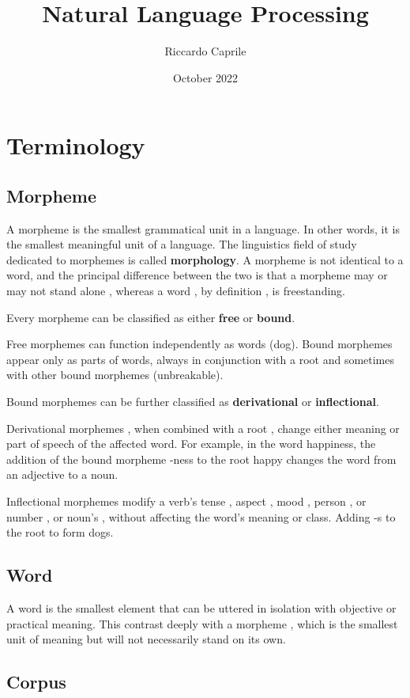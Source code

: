 \documentclass{article}
\title{Natural Language Processing}
\author{Riccardo Caprile}
\date{October 2022}
\begin{document}
\maketitle

\vspace{200mm}
\section{Terminology}

\subsection{Morpheme}
A morpheme is the smallest grammatical unit in a language. In other words, it is the smallest meaningful unit of a language.
The linguistics field of study dedicated to morphemes is called \textbf{morphology}. A morpheme is not identical to a word, and the principal difference between the two is that a morpheme may or may not stand alone , whereas a word , by definition , is freestanding.

Every morpheme can be classified as either \textbf{free} or \textbf{bound}.

Free morphemes can function independently as words (dog).
Bound morphemes appear only as parts of words, always in conjunction with a root and sometimes with other bound morphemes (unbreakable).

Bound morphemes can be further classified as \textbf{derivational} or \textbf{inflectional}.

Derivational morphemes , when combined with a root , change either meaning or part of speech of the affected word. For example, in the word happiness, the addition of the bound morpheme -ness to the root happy changes the word from an adjective to a noun.

Inflectional morphemes modify a verb's tense , aspect , mood , person , or number , or noun's , without affecting the word's meaning or class.
Adding -s to the root to form dogs.

\subsection{Word}

A word is the smallest element that can be uttered in isolation with objective or practical meaning.
This contrast deeply with a morpheme , which is the smallest unit of meaning but will not necessarily stand on its own.

\subsection{Corpus}
\end{document}

